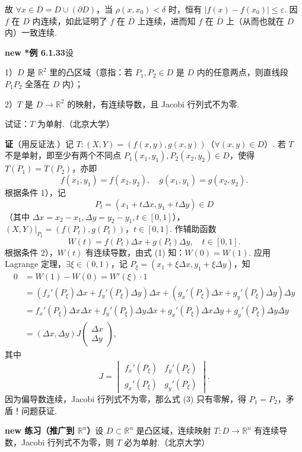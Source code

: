 \documentclass[UTF8, 12pt, fontset=fandol, oneside]{ctexart}
\begin{document}
故 $\forall x\in\overline D=D\cup(\partial D)$，当 $\rho(x,x_0)<\delta$ 时，恒有 $|f(x)-f(x_0)|\le\varepsilon$. 因 $f$ 在 $D$ 内连续，如此证明了 $f$ 在 $\overline D$ 上连续，进而知 $f$ 在 $\overline D$ 上（从而也就在 $D$ 内）一致连续.

\noindent\textbf{new *例 6.1.33}\quad 设

1）$D$ 是 $\mathbb{R}^2$ 里的凸区域（意指：若 $P_1,P_2\in D$ 是 $D$ 内的任意两点，则直线段 $P_1P_2$ 全落在 $D$ 内）；

2）$T$ 是 $D\to\mathbb{R}^2$ 的映射，有连续导数，且 Jacobi 行列式不为零.

试证：$T$ 为单射.（北京大学）

\noindent\textbf{证}\quad （用反证法.）记 $T:(X,Y)=(f(x,y),g(x,y))$（$\forall(x,y)\in D$）. 若 $T$ 不是单射，即至少有两个不同点 $P_1(x_1,y_1),P_2(x_2,y_2)\in D$，使得 $T(P_1)=T(P_2)$，亦即
\[
  f(x_1,y_1)=f(x_2,y_2),\quad g(x_1,y_1)=g(x_2,y_2). \tag{1}
\]
根据条件 1），记
\[
  P_t=(x_1+t\Delta x,y_1+t\Delta y)\in D
\]
（其中 $\Delta x=x_2-x_1,\Delta y=y_2-y_1,t\in[0,1]$），$(X,Y)|_{P_t}=(f(P_t),g(P_t))$，$t\in[0,1]$. 作辅助函数
\[
  W(t)=f(P_t)\Delta x+g(P_t)\Delta y,\quad t\in[0,1]. \tag{2}
\]
根据条件 2），$W(t)$ 有连续导数，由式 (1) 知：$W(0)=W(1)$. 应用 Lagrange 定理，$\exists\xi\in(0,1)$，记 $P_\xi=(x_1+\xi\Delta x,y_1+\xi\Delta y)$，知
\[
\begin{aligned}
0&=W(1)-W(0)=W'(\xi)\cdot1\\
&=(f_x'(P_\xi)\Delta x+f_y'(P_\xi)\Delta y)\Delta x
+(g_x'(P_\xi)\Delta x+g_y'(P_\xi)\Delta y)\Delta y\\
&=f_x'(P_\xi)\Delta x\Delta x+f_y'(P_\xi)\Delta y\Delta x
+g_x'(P_\xi)\Delta x\Delta y+g_y'(P_\xi)\Delta y\Delta y\\
&=(\Delta x,\Delta y)J
\begin{pmatrix}
\Delta x\\
\Delta y
\end{pmatrix},
\end{aligned}
\tag{3}
\]
其中
\[
  J=
  \begin{vmatrix}
  f_x'(P_\xi)&f_y'(P_\xi)\\
  g_x'(P_\xi)&g_y'(P_\xi)
  \end{vmatrix}.
\]
因为偏导数连续，Jacobi 行列式不为零，那么式 (3) 只有零解，得 $P_1=P_2$，矛盾！问题获证.

\noindent\textbf{new 练习（推广到 $\mathbb{R}^n$）}\quad 设 $D\subset\mathbb{R}^n$ 是凸区域，连续映射 $T:D\to\mathbb{R}^n$ 有连续导数，Jacobi 行列式不为零，则 $T$ 必为单射.（北京大学）
\end{document}
